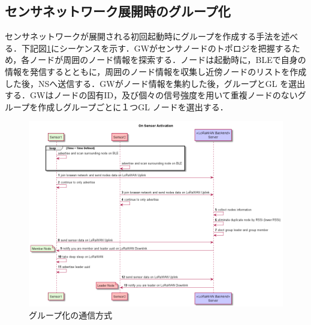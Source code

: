 \subsection{センサネットワーク展開時のグループ化}
センサネットワークが展開される初回起動時にグループを作成する手法を述べる．下記図\ref{fig:group_on_activation}にシーケンスを示す．GWがセンサノードのトポロジを把握するため，各ノードが周囲のノード情報を探索する．ノードは起動時に，BLEで自身の情報を発信するとともに，周囲のノード情報を収集し近傍ノードのリストを作成した後，NSへ送信する．GWがノード情報を集約した後，グループとGL を選出する．GWはノードの固有ID，及び個々の信号強度を用いて重複ノードのないグループを作成しグループごとに１つGL ノードを選出する．

\begin{figure}[]
    \begin{center}
    \includegraphics[width=14cm]{figures/グループ化_センサ起動時.png}
    \caption{グループ化の通信方式}
    \label{fig:group_on_activation}
    \end{center}
\end{figure}